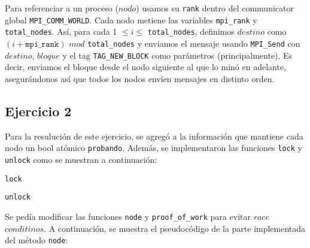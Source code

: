 \documentclass[10pt, a4paper, hidelinks]{article}
\begin{document}
Para referenciar a un proceso ($nodo$) usamos su \texttt{rank} dentro del communicator global \texttt{MPI\_COMM\_WORLD}. Cada nodo metiene las variables \texttt{mpi\_rank} y \texttt{total\_nodes}. Así, para cada 1 $\leq i \leq$ \texttt{total\_nodes}, definimos $destino$ como $(i + \texttt{mpi\_rank})$ $mod$ \texttt{total\_nodes} y enviamos el mensaje usando \texttt{MPI\_Send} con $destino$, $bloque$ y el tag \texttt{TAG\_NEW\_BLOCK} como parámetros (principalmente). Es decir, enviamos el bloque desde el nodo siguiente al que lo minó en adelante, asegurándonos así que todos los nodos envíen mensajes en distinto orden.
 
\subsection{Ejercicio 2}
Para la resulución de este ejercicio, se agregó a la información que mantiene cada nodo un bool atómico \texttt{probando}. Además, se implementaron las funciones \texttt{lock} y \texttt{unlock} como se muestran a continuación:

\begin{algorithm}[H]
\SetAlgoLined
{}
\caption{\texttt{lock}}
\end{algorithm}

\begin{algorithm}[H]
\SetAlgoLined
{}
\caption{\texttt{unlock}}
\end{algorithm}

Se pedía modificar las funciones \texttt{node} y \texttt{proof\_of\_work} para evitar $race$ $conditinos$. A continuación, se muestra el pseudocódigo de la parte implementada del método \texttt{node}:
\end{document}
